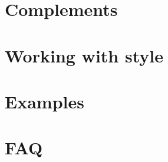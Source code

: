 \documentclass[DIV         = 14,
               fontsize    = 10,
               index       = totoc,
               twoside,
               cadre,
               headings    = small,
               ]{tkz-doc}
\begin{document}
\part{Complements}





\part{Working with style}


\part{Examples}



\part{FAQ}


\clearpage\newpage
\small\printindex
\end{document}
